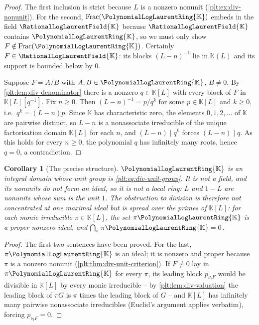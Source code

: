 \documentclass[11pt,oneside]{article}
\theoremstyle{plain}
\newtheorem{corollary}[theorem]{Corollary}
\theoremstyle{definition}
\theoremstyle{remark}
\newcommand{\K}{\mathbb{K}}
\newcommand{\PLlau}{\PolynomialLogLaurentRing{\K}}       %
\newcommand{\PLrat}{\RationalLogLaurentField{\K}}        %
\newcommand{\ordt}{\nu_{t}}                              %
\begin{document}
\begin{proof}
The first inclusion is strict because \(L\) is a nonzero nonunit
(\cref{plt:ex:div-nonunit}).  For the second, \(\operatorname{Frac}(\PLlau)\)
embeds in the field \(\PLrat\) because \(\PLrat\) contains \(\PLlau\), so we
must only show \(F\notin\operatorname{Frac}(\PLlau)\).  Certainly
\(F\in\PLrat\): its blocks \((L-n)^{-1}\) lie in \(\K(L)\) and its support is
bounded below by \(0\).

Suppose \(F=A/B\) with \(A,B\in\PLlau\), \(B\ne0\).  By
\cref{plt:lem:div-denominator} there is a nonzero \(q\in\K[L]\) with every
block of \(F\) in \(\K[L][q^{-1}]\).  Fix \(n\ge0\).  Then
\((L-n)^{-1}=p/q^{k}\) for some \(p\in\K[L]\) and \(k\ge0\), i.e.\
\(q^{k}=(L-n)p\).  Since \(\K\) has characteristic zero, the elements
\(0,1,2,\dots\) of \(\K\) are pairwise distinct, so \(L-n\) is a nonassociate
irreducible of the unique factorisation domain \(\K[L]\) for each \(n\), and
\((L-n)\mid q^{k}\) forces \((L-n)\mid q\).  As this holds for every
\(n\ge0\), the polynomial \(q\) has infinitely many roots, hence \(q=0\), a
contradiction.
\end{proof}

\begin{corollary}[The precise structure]\label{plt:cor:div-domain-not-field}
\(\PLlau\) is an integral domain whose unit group is
\cref{plt:eq:div-unit-group}.  It is not a field, and its nonunits do not form
an ideal, so it is not a local ring: \(L\) and \(1-L\) are nonunits whose sum
is the unit \(1\).  The obstruction to division is therefore not concentrated
at one maximal ideal but is spread over the primes of \(\K[L]\): for each monic
irreducible \(\pi\in\K[L]\), the set \(\pi\PLlau\) is a proper nonzero ideal,
and \(\bigcap_{\pi}\pi\PLlau=0\).
\end{corollary}

\begin{proof}
The first two sentences have been proved.  For the last, \(\pi\PLlau\) is an
ideal; it is nonzero and proper because \(\pi\) is a nonzero nonunit
(\cref{plt:thm:div-unit-criterion}).  If \(F\ne0\) lay in \(\pi\PLlau\) for
every \(\pi\), its leading block \(p_{\ordt F}\) would be divisible in
\(\K[L]\) by every monic irreducible -- by \cref{plt:lem:div-valuation} the
leading block of \(\pi G\) is \(\pi\) times the leading block of \(G\) -- and
\(\K[L]\) has infinitely many pairwise nonassociate irreducibles (Euclid's
argument applies verbatim), forcing \(p_{\ordt F}=0\).
\end{proof}
\end{document}
